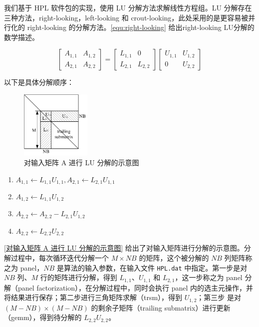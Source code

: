 我们基于 HPL 软件包的实现，使用 LU 分解方法求解线性方程组。LU 分解存在三种方法，right-looking，left-looking 和 crout-looking，此处采用的是更容易被并行化的 right-looking 的分解方法\cite{2013Correcting}。\autoref{equ:right-looking} 给出right-looking LU分解的数学描述。

\begin{equation}
    \label{equ:right-looking}
    \begin{bmatrix}
        A_{1,1} & A_{1,2} \\
        A_{2,1} & A_{2,2}
    \end{bmatrix}
    =
    \begin{bmatrix}
        L_{1,1} & 0       \\
        L_{2,1} & L_{2,2}
    \end{bmatrix}
    \begin{bmatrix}
        U_{1,1} & U_{1,2} \\
        0       & U_{2,2}
    \end{bmatrix}
\end{equation}

以下是具体分解顺序：

\begin{figure}
    \centering
    \includegraphics[width=0.3\textwidth]{image/chap02/LU}
    \caption{对输入矩阵 A 进行 LU 分解的示意图}
    \label{对输入矩阵 A 进行 LU 分解的示意图}
\end{figure}

\begin{enumerate}
    \item $A_{1,1} \leftarrow L_{1,1} U_{1,1},A_{2,1} \leftarrow L_{2,1}U_{1,1}$
    \item $A_{1,2} \leftarrow L_{1,1} U_{1,2}$
    \item $A_{2,2} \leftarrow A_{2,2} - L_{2,1}U_{1,2}$
    \item $A_{2,2} \leftarrow L_{2,2}U_{2,2}$
\end{enumerate}

\autoref{对输入矩阵 A 进行 LU 分解的示意图} 给出了对输入矩阵进行分解的示意图。分解过程中，每次循环迭代分解一个 $M\times\mathit{NB}$ 的矩阵，这个被分解的 $\mathit{NB}$ 列矩阵称之为 panel，$\mathit{NB}$ 是算法的输入参数，在输入文件 \lstinline{HPL.dat} 中指定。第一步是对 $\mathit{NB}$ 列、$M$ 行的矩阵进行分解，得到 $L_{1,1}$、$U_{1,1}$ 和 $L_{2,1}$，这一步称之为 panel 分解（panel factorization），在分解过程中，同时会执行 panel 内的选主元操作，并将结果进行保存；第二步进行三角矩阵求解（trsm），得到 $U_{1,2}$；第三步
    是对 $(M-\mathit{NB}) \times (M-\mathit{NB})$ 的剩余子矩阵（trailing submatrix）进行更新（gemm），得到待分解的 $L_{2,2}U_{2,2}$。


